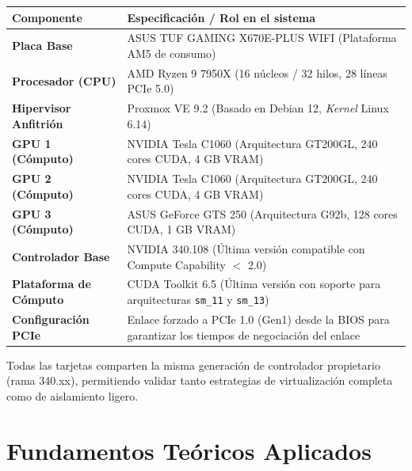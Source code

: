 \documentclass[a4paper,11pt]{article}
\begin{document}
\begin{center}
\small
\begin{tabular}{lp{10.2cm}}
\toprule
\textbf{Componente} & \textbf{Especificación / Rol en el sistema} \\
\midrule
\textbf{Placa Base} & ASUS TUF GAMING X670E-PLUS WIFI (Plataforma AM5 de consumo) \\
\textbf{Procesador (CPU)} & AMD Ryzen 9 7950X (16 núcleos / 32 hilos, 28 líneas PCIe 5.0) \\
\textbf{Hipervisor Anfitrión} & Proxmox VE 9.2 (Basado en Debian 12, \textit{Kernel} Linux 6.14) \\
\textbf{GPU 1 (Cómputo)} & NVIDIA Tesla C1060 (Arquitectura GT200GL, 240 cores CUDA, 4 GB VRAM) \\
\textbf{GPU 2 (Cómputo)} & NVIDIA Tesla C1060 (Arquitectura GT200GL, 240 cores CUDA, 4 GB VRAM) \\
\textbf{GPU 3 (Cómputo)} & ASUS GeForce GTS 250 (Arquitectura G92b, 128 cores CUDA, 1 GB VRAM) \\
\textbf{Controlador Base} & NVIDIA 340.108 (Última versión compatible con Compute Capability $<$ 2.0) \\
\textbf{Plataforma de Cómputo} & CUDA Toolkit 6.5 (Última versión con soporte para arquitecturas \texttt{sm\_11} y \texttt{sm\_13}) \\
\textbf{Configuración PCIe} & Enlace forzado a PCIe 1.0 (Gen1) desde la BIOS para garantizar los tiempos de negociación del enlace \\
\bottomrule
\end{tabular}
\end{center}

Todas las tarjetas comparten la misma generación de controlador propietario (rama 340.xx), permitiendo validar tanto
estrategias de virtualización completa como de aislamiento ligero.

\section{Fundamentos Teóricos Aplicados}
\end{document}
